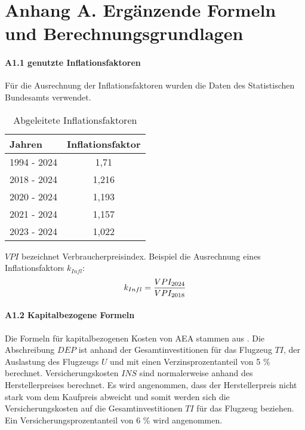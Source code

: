 \chapter{Anhang A. Ergänzende Formeln und Berechnungsgrundlagen}
\subsubsection{A1.1 genutzte Inflationsfaktoren}
Für die Ausrechnung der Inflationsfaktoren wurden die Daten des Statistischen Bundesamts verwendet. 
\begin{table}[h]
	\begin{center}
    \caption{Abgeleitete Inflationsfaktoren}
	\label{Inflationsfaktoren}
	\begin{tabular}{|l|c|}
		\hline
		\textbf{Jahren} & \textbf{Inflationsfaktor} \\ \hline
		1994 - 2024 & 1,71 \\ \hline
		2018 - 2024 & 1,216 \\ \hline
		2020 - 2024 & 1,193 \\ \hline
        2021 - 2024 & 1,157 \\ \hline
        2023 - 2024 & 1,022 \\ \hline
	\end{tabular}
    \end{center}
\end{table}

$VPI$ bezeichnet Verbraucherpreisindex. Beispiel die Ausrechnung eines Inflationsfaktors $k_{Infl}$:
\begin{equation}
	{k_{Infl}} = \frac{VPI_{2024}}{VPI_{2018}} \\
	\label{inflation}
 \end{equation}

\subsubsection{A1.2 Kapitalbezogene Formeln}
Die Formeln für kapitalbezogenen Kosten von AEA stammen aus \cite{minwoo2019analysis}.
Die Abschreibung $DEP$ ist anhand der Gesamtinvestitionen für das Flugzeug $TI$, der Auslastung des Flugzeugs $U$
und mit einen Verzinsprozentanteil von 5 \% \cite{scholz_design_evaluation_doc} berechnet.
Versicherungskosten $INS$ sind normalerweise anhand des Herstellerpreises berechnet. 
Es wird angenommen, dass der Herstellerpreis nicht stark
vom dem Kaufpreis abweicht und somit werden sich die Versicherungskosten auf die Gesamtinvestitionen $TI$
für das Flugzeug beziehen. Ein Versicherungsprozentanteil von 6 \% wird angenommen.

